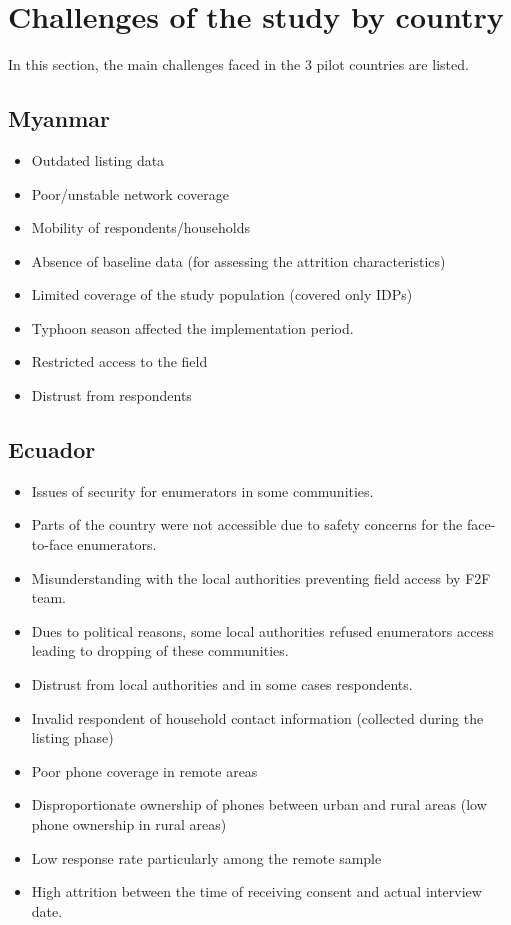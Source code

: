 \documentclass[11pt,harvard]{article}
\begin{document}
\section{Challenges of the study by country}

In this section, the main challenges faced in the 3 pilot countries are listed. 

\subsection{Myanmar}

\begin{itemize}[label=--, left=1.5em]
	\item[1] Outdated listing data
	\item[2] Poor/unstable network coverage
	\item[3] Mobility of respondents/households
	\item[4] Absence of baseline data (for assessing the attrition characteristics) 
	\item[5] Limited coverage of the study population (covered only IDPs)
	\item[6] Typhoon season affected the implementation period.
	\item[7] Restricted access to the field
	\item[8] Distrust from respondents
\end{itemize}


\subsection{Ecuador}

\begin{itemize}[label=--, left=1.5em]
	\item[1] Issues of security for enumerators in some communities.
		\item[a]	Parts of the country were not accessible due to safety concerns for the face-to-face enumerators.
	\item[2] Misunderstanding with the local authorities preventing field access by F2F team.
		\item[a]	Dues to political reasons, some local authorities refused enumerators access leading to dropping of these communities.
		\item[b]	Distrust from local authorities and in some cases respondents.
	\item[3] Invalid respondent of household contact information (collected during the listing phase)
	\item[4] Poor phone coverage in remote areas
	\item[5] Disproportionate ownership of phones between urban and rural areas (low phone ownership in rural areas)
	\item[6] Low response rate particularly among the remote sample
		\item[a]	High attrition between the time of receiving consent and actual interview date.
\end{itemize}
\end{document}

